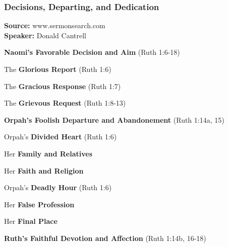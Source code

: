 \subsubsection{Decisions, Departing, and Dedication}
\textbf{Source: }www.sermonsearch.com\\
\textbf{Speaker: }Donald Cantrell\\
\begin{compactenum}[I.][7]
    \item \textbf{Naomi's Favorable Decision and Aim} (Ruth 1:6-18)
	\begin{compactenum}[A.]
	    	\item The \textbf{Glorious Report} (Ruth 1:6)
    	\item The \textbf{Gracious Response} (Ruth 1:7)
    	\item The \textbf{Grievous Request} (Ruth 1:8-13)
	\end{compactenum}
    \item \textbf{Orpah's Foolish Departure and Abandonement} (Ruth 1:14a, 15)
    	\begin{compactenum}[A.]
    		\item Orpah's \textbf{Divided Heart} (Ruth 1:6)
    		\begin{compactenum}[1.]
    			\item Her \textbf{Family and Relatives}
    			\item Her \textbf{Faith and Religion}
    		\end{compactenum}
	    	\item Orpah's \textbf{Deadly Hour} (Ruth 1:6)
    		\begin{compactenum}[1.]
    			\item Her \textbf{False Profession}
    			\item Her \textbf{Final Place}
    		\end{compactenum}
		\end{compactenum}
    \item \textbf{Ruth's Faithful Devotion and Affection} (Ruth 1:14b, 16-18)

\end{compactenum}
